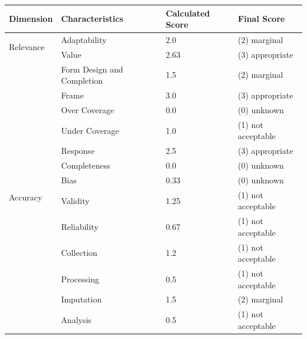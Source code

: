 \begin{table}[htbp]
    \begin{tabular}{llll}
        \toprule
        Dimension                           & Characteristics               & Calculated Score  & Final Score           \\ \midrule
        \multirow{2}{*}{Relevance}          & Adaptability                  & 2.0               & (2) marginal          \\
                                            & Value                         & 2.63              & (3) appropriate       \\ \midrule
        \multirow{13}{*}{Accuracy}          & Form Design and Completion    & 1.5               & (2) marginal          \\
                                            & Frame                         & 3.0               & (3) appropriate       \\
                                            & Over Coverage                 & 0.0               & (0) unknown           \\
                                            & Under Coverage                & 1.0               & (1) not acceptable    \\
                                            & Response                      & 2.5               & (3) appropriate       \\
                                            & Completeness                  & 0.0               & (0) unknown           \\
                                            & Bias                          & 0.33              & (0) unknown           \\
                                            & Validity                      & 1.25              & (1) not acceptable    \\
                                            & Reliability                   & 0.67              & (1) not acceptable    \\
                                            & Collection                    & 1.2               & (1) not acceptable    \\
                                            & Processing                    & 0.5               & (1) not acceptable    \\
                                            & Imputation                    & 1.5               & (2) marginal          \\
                                            & Analysis                      & 0.5               & (1) not acceptable    \\ \midrule

\end{tabular}
\end{table}
